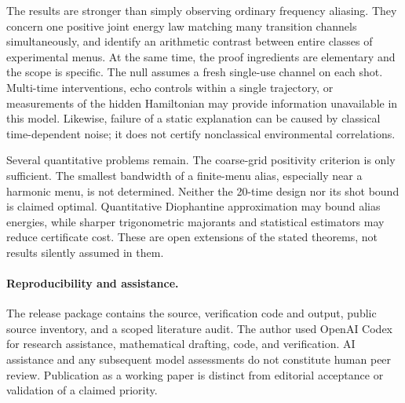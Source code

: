\documentclass[11pt,a4paper]{article}
\theoremstyle{remark}\newtheorem{remark}[theorem]{Remark}
\begin{document}
The results are stronger than simply observing ordinary frequency
aliasing. They concern one positive joint energy law matching many
transition channels simultaneously, and identify an arithmetic contrast
between entire classes of experimental menus. At the same time, the
proof ingredients are elementary and the scope is specific. The null
assumes a fresh single-use channel on each shot. Multi-time interventions,
echo controls within a single trajectory, or measurements of the hidden
Hamiltonian may provide information unavailable in this model. Likewise,
failure of a static explanation can be caused by classical time-dependent
noise; it does not certify nonclassical environmental correlations.

Several quantitative problems remain. The coarse-grid positivity
criterion is only sufficient. The smallest bandwidth of a finite-menu
alias, especially near a harmonic menu, is not determined. Neither the
20-time design nor its shot bound is claimed optimal. Quantitative
Diophantine approximation may bound alias energies, while sharper
trigonometric majorants and statistical estimators may reduce certificate
cost. These are open extensions of the stated theorems, not results
silently assumed in them.

\paragraph{Reproducibility and assistance.}
The release package contains the source, verification code and output,
public source inventory, and a scoped literature audit. The author used
OpenAI Codex for research assistance, mathematical drafting, code, and
verification. AI assistance and any subsequent model assessments do not
constitute human peer review. Publication as a working paper is distinct
from editorial acceptance or validation of a claimed priority.
\end{document}
